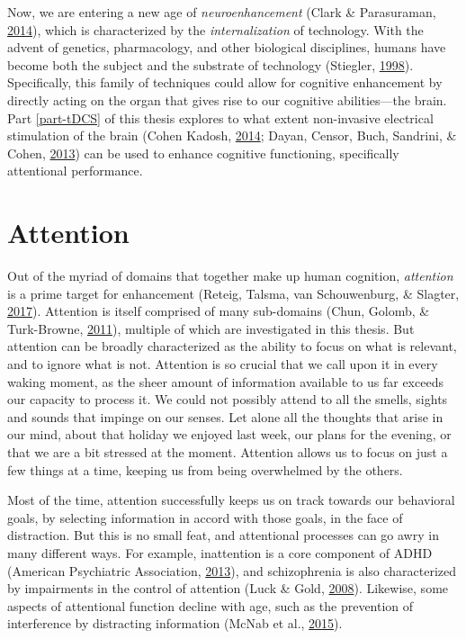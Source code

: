 \documentclass[11pt,]{memoir}
\begin{document}
Now, we are entering a new age of \emph{neuroenhancement} (Clark \& Parasuraman, \protect\hyperlink{ref-Clark2014}{2014}), which is characterized by the \emph{internalization} of technology. With the advent of genetics, pharmacology, and other biological disciplines, humans have become both the subject and the substrate of technology (Stiegler, \protect\hyperlink{ref-Stiegler1998}{1998}). Specifically, this family of techniques could allow for cognitive enhancement by directly acting on the organ that gives rise to our cognitive abilities---the brain. Part \ref{part-tDCS} of this thesis explores to what extent non-invasive electrical stimulation of the brain (Cohen Kadosh, \protect\hyperlink{ref-CohenKadosh2014}{2014}; Dayan, Censor, Buch, Sandrini, \& Cohen, \protect\hyperlink{ref-Dayan2013}{2013}) can be used to enhance cognitive functioning, specifically attentional performance.

\hypertarget{attention}{%
\section{Attention}\label{attention}}

Out of the myriad of domains that together make up human cognition, \emph{attention} is a prime target for enhancement (Reteig, Talsma, van Schouwenburg, \& Slagter, \protect\hyperlink{ref-Reteig2017}{2017}). Attention is itself comprised of many sub-domains (Chun, Golomb, \& Turk-Browne, \protect\hyperlink{ref-Chun2011}{2011}), multiple of which are investigated in this thesis. But attention can be broadly characterized as the ability to focus on what is relevant, and to ignore what is not. Attention is so crucial that we call upon it in every waking moment, as the sheer amount of information available to us far exceeds our capacity to process it. We could not possibly attend to all the smells, sights and sounds that impinge on our senses. Let alone all the thoughts that arise in our mind, about that holiday we enjoyed last week, our plans for the evening, or that we are a bit stressed at the moment. Attention allows us to focus on just a few things at a time, keeping us from being overwhelmed by the others.

Most of the time, attention successfully keeps us on track towards our behavioral goals, by selecting information in accord with those goals, in the face of distraction. But this is no small feat, and attentional processes can go awry in many different ways. For example, inattention is a core component of ADHD (American Psychiatric Association, \protect\hyperlink{ref-AmericanPsychiatricAssociation2013}{2013}), and schizophrenia is also characterized by impairments in the control of attention (Luck \& Gold, \protect\hyperlink{ref-Luck2008}{2008}). Likewise, some aspects of attentional function decline with age, such as the prevention of interference by distracting information (McNab et al., \protect\hyperlink{ref-McNab2015}{2015}).
\end{document}
